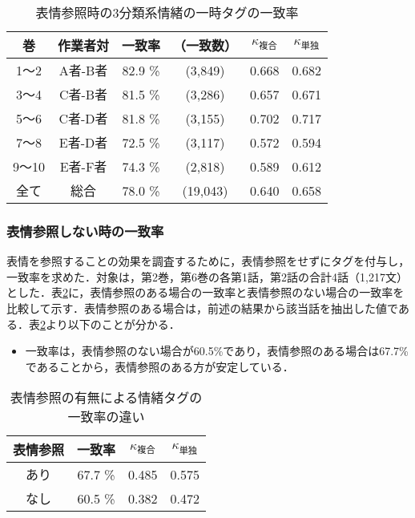 \documentclass[japanese]{jnlp_1.3c}
\begin{document}
\begin{table}[b]
\begin{center}
\caption{表情参照時の3分類系情緒の一時タグの一致率} \label{tab4}
\begin{tabular}{cccccc}
\hline \hline
巻     & 作業者対   & 一致率 & （一致数） & $\kappa_{\mbox{複合}}$ & $\kappa_{\mbox{単独}}$ \\
\hline
1〜2   & A者-B者  & 82.9 \% & (3,849)  & 0.668  & 0.682 \\
3〜4   & C者-B者  & 81.5 \% & (3,286)  & 0.657  & 0.671 \\
5〜6   & C者-D者  & 81.8 \% & (3,155)  & 0.702  & 0.717 \\
7〜8   & E者-D者  & 72.5 \% & (3,117)  & 0.572  & 0.594 \\
9〜10  & E者-F者  & 74.3 \% & (2,818)  & 0.589  & 0.612 \\
\hline
全て   & 総合     & 78.0 \% & (19,043) & 0.640  & 0.658 \\
\hline
\end{tabular}
\end{center}
\end{table}


\subsubsection{表情参照しない時の一致率}

表情を参照することの効果を調査するために，表情参照をせずにタグを付与し，一致率を求めた．対象は，第2巻，第6巻の各第1話，第2話の合計4話（1,217文）とした．表\ref{tab5}に，表情参照のある場合の一致率と表情参照のない場合の一致率を比較して示す．表情参照のある場合は，前述の結果から該当話を抽出した値である．表\ref{tab5}より以下のことが分かる．
\begin{itemize}
\item 一致率は，表情参照のない場合が60.5\%であり，表情参照のある場合は67.7\% であることから，表情参照のある方が安定している．
\end{itemize}

\begin{table}[t]
\begin{center}
\caption{表情参照の有無による情緒タグの一致率の違い} \label{tab5}
\begin{tabular}{cccc}
\hline \hline
表情参照 & 一致率  & $\kappa_{\mbox{複合}}$ & $\kappa_{\mbox{単独}}$ \\
\hline
あり     & 67.7 \% & 0.485 & 0.575 \\
なし     & 60.5 \% & 0.382 & 0.472 \\
\hline
\end{tabular}
\end{center}
\end{table}
\end{document}

